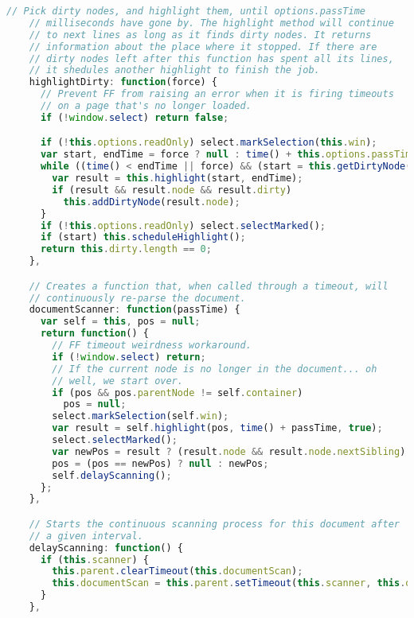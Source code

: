 \begin{lstlisting}[language=Javascript]
    // Pick dirty nodes, and highlight them, until options.passTime
    // milliseconds have gone by. The highlight method will continue
    // to next lines as long as it finds dirty nodes. It returns
    // information about the place where it stopped. If there are
    // dirty nodes left after this function has spent all its lines,
    // it shedules another highlight to finish the job.
    highlightDirty: function(force) {
      // Prevent FF from raising an error when it is firing timeouts
      // on a page that's no longer loaded.
      if (!window.select) return false;

      if (!this.options.readOnly) select.markSelection(this.win);
      var start, endTime = force ? null : time() + this.options.passTime;
      while ((time() < endTime || force) && (start = this.getDirtyNode())) {
        var result = this.highlight(start, endTime);
        if (result && result.node && result.dirty)
          this.addDirtyNode(result.node);
      }
      if (!this.options.readOnly) select.selectMarked();
      if (start) this.scheduleHighlight();
      return this.dirty.length == 0;
    },

    // Creates a function that, when called through a timeout, will
    // continuously re-parse the document.
    documentScanner: function(passTime) {
      var self = this, pos = null;
      return function() {
        // FF timeout weirdness workaround.
        if (!window.select) return;
        // If the current node is no longer in the document... oh
        // well, we start over.
        if (pos && pos.parentNode != self.container)
          pos = null;
        select.markSelection(self.win);
        var result = self.highlight(pos, time() + passTime, true);
        select.selectMarked();
        var newPos = result ? (result.node && result.node.nextSibling) : null;
        pos = (pos == newPos) ? null : newPos;
        self.delayScanning();
      };
    },

    // Starts the continuous scanning process for this document after
    // a given interval.
    delayScanning: function() {
      if (this.scanner) {
        this.parent.clearTimeout(this.documentScan);
        this.documentScan = this.parent.setTimeout(this.scanner, this.options.continuousScanning);
      }
    },


\end{lstlisting}

